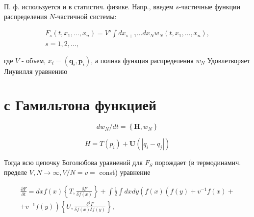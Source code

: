 \documentclass[10pt]{article}
\begin{document}
П. ф. используется и в статистич. физике. Напр., введем $s$-частичные функции распределения $N$-частичной системы:



\[

\begin{gathered}

F_{s}\left(t, x_{1}, \ldots, x_{n}\right)=V^{s} \int d x_{s+1} \ldots d x_{N} w_{N}\left(t, x_{1}, \ldots, x_{n}\right), \\

s=1,2, \ldots,

\end{gathered}

\]



где $V$ - объем, $x_{i}=\left(\boldsymbol{q}_{i}, \boldsymbol{p}_{i}\right)$, а полная функция распределения $w_{N}$ Удовлетворяет Лиувилля уравнению



\section{с Гамильтона функцией}

\[

d w_{N} / d t=\left\{\boldsymbol{H}, w_{N}\right\}

\]



\[

H=T\left(p_{i}\right)+\boldsymbol{U}\left(\left|q_{i}-q_{j}\right|\right)

\]



Тогда всю цепочку Боголюбова уравнений для $F_{S}$ порождает (в термодинамич. пределе $V, N \rightarrow \infty, V / N=v=$ const) уравнение



\[

\begin{gathered}

\frac{\partial F}{\partial t}=d x f(x)\left\{T, \frac{\delta F}{\delta f(x)}\right\}+\int \frac{1}{2} \int d x d y\left(f ( x ) \left(f(y)+v^{-1} f(x)+\right.\right. \\

\left.+v^{-1} f(y)\right)\left\{U, \frac{\delta^{2} F}{\delta f(x) \delta f(y)}\right\},

\end{gathered}

\]
\end{document}
